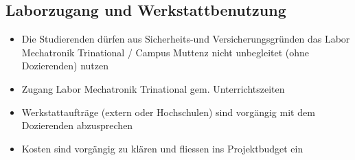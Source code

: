 \subsection*{Laborzugang und Werkstattbenutzung}
\begin{itemize}
    \item Die Studierenden dürfen aus Sicherheits-und Versicherungsgründen das Labor Mechatronik Trinational / Campus Muttenz nicht unbegleitet (ohne Dozierenden) nutzen
    \item Zugang Labor Mechatronik Trinational gem. Unterrichtszeiten
    \item Werkstattaufträge (extern oder Hochschulen) sind vorgängig mit dem Dozierenden abzusprechen
    \item Kosten sind vorgängig zu klären und fliessen ins Projektbudget ein 
\end{itemize}